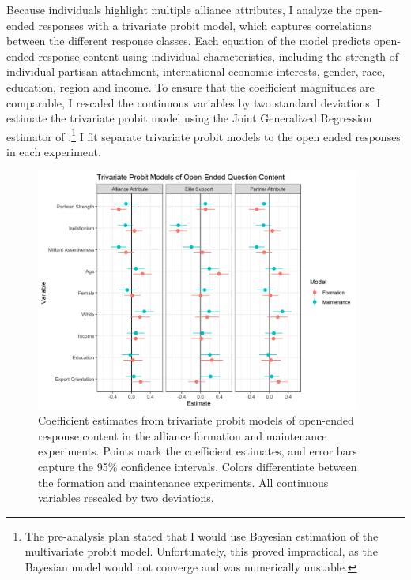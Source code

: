 \documentclass[12pt]{article}
\begin{document}
Because individuals highlight multiple alliance attributes, I analyze the open-ended responses with a trivariate probit model, which captures correlations between the different response classes. 
Each equation of the model predicts open-ended response content using individual characteristics, including the strength of individual partisan attachment, international economic interests, gender, race, education, region and income. 
To ensure that the coefficient magnitudes are comparable, I rescaled the continuous variables by two standard deviations. 
I estimate the trivariate probit model using the Joint Generalized Regression estimator of \citet{Braumoelleretal2018}.\footnote{The pre-analysis plan stated that I would use Bayesian estimation of the multivariate probit model. Unfortunately, this proved impractical, as the Bayesian model would not converge and was numerically unstable.} 
I fit separate trivariate probit models to the open ended responses in each experiment. 


\begin{figure}
	\centering
		\includegraphics[width=0.95\textwidth]{open-questions-res.png}
	\caption{Coefficient estimates from trivariate probit models of open-ended response content in the alliance formation and maintenance experiments. Points mark the coefficient estimates, and error bars capture the 95\% confidence intervals. Colors differentiate between the formation and maintenance experiments. All continuous variables rescaled by two deviations.}
	\label{fig:openq-res}
\end{figure}
\end{document}
